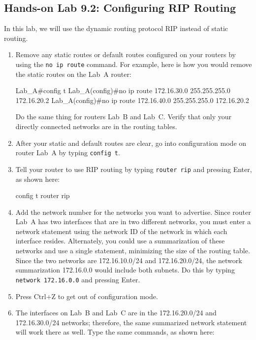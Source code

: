 \subsection[Hands-on Lab 9.2: Configuring RIP
Routing]{\texorpdfstring{\protect\hypertarget{c09.xhtmlux5cux23c09-sec-22}{}{}Hands-on
Lab 9.2: Configuring RIP
Routing}{Hands-on Lab 9.2: Configuring RIP Routing}}

In this lab, we will use the dynamic routing protocol RIP instead of
static routing.

\begin{enumerate}
\item
  Remove any static routes or default routes configured on your routers
  by using the \texttt{no\ ip\ route} command. For example, here is how
  you would remove the static routes on the Lab~A router:

\begin{cli}
Lab_A#config t
Lab_A(config)#no ip route 172.16.30.0 255.255.255.0
  172.16.20.2
Lab_A(config)#no ip route 172.16.40.0 255.255.255.0
  172.16.20.2
\end{cli}

  Do the same thing for routers Lab~B and Lab~C. Verify that only your
  directly connected networks are in the routing tables.
\item
  After your static and default routes are clear, go into configuration
  mode on router Lab~A by typing \texttt{config\ t}.
\item
  Tell your router to use RIP routing by typing \texttt{router\ rip} and
  pressing Enter, as shown here:

\begin{cli}
config t
router rip
\end{cli}
\item
  Add the network number for the networks you want to advertise. Since
  router Lab~A has two interfaces that are in two different networks,
  you must enter a network statement using the network ID of the network
  in which each interface resides. Alternately, you could use a
  summarization of these networks and use a single statement, minimizing
  the size of the routing table. Since the two networks are
  172.16.10.0/24 and 172.16.20.0/24, the network summarization
  172.16.0.0 would include both subnets. Do this by typing
  \texttt{network\ 172.16.0.0} and pressing Enter.
\item
  Press Ctrl+Z to get out of configuration mode.
\item
  The interfaces on Lab~B and Lab~C are in the 172.16.20.0/24 and
  172.16.30.0/24 networks; therefore, the same summarized network
  statement will work there as well. Type the same commands, as shown
  here:


\end{enumerate}
